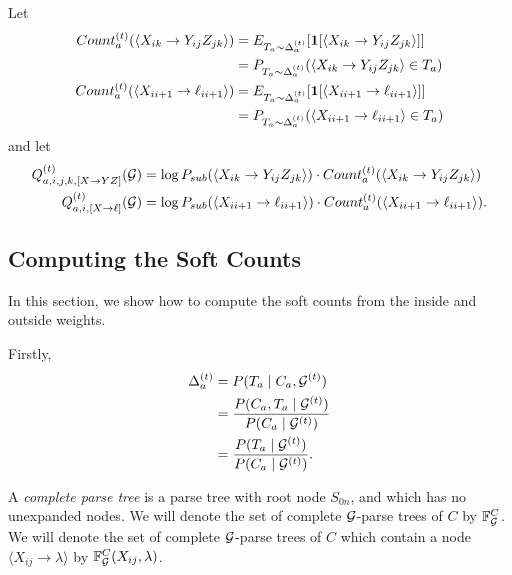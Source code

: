 
Let 
\begin{align*}
  Count_a^{(t)}(\langle X_{ik} \to Y_{ij} Z_{jk} \rangle) &=  E_{T_a \sim \Delta_a^{(t)}}[\mathbf{1} [ 
\langle X_{ik}
\to Y_{ij} Z_{jk} \rangle]]\\
&= P_{T_a \sim \Delta_a^{(t)}}( \langle X_{ik} \to Y_{ij} Z_{jk}
\rangle \in T_a)\\
Count_a^{(t)}(\langle X_{ii+1} \to \ell_{i i+1} \rangle) &=
E_{T_a \sim \Delta_a^{(t)}}[\mathbf{1} [ \langle X_{i i+1}
\to \ell_{i i+1} \rangle]] \\
&= P_{T_a \sim \Delta_a^{(t)}}( \langle X_{i i+1} \to \ell_{i i+1} \rangle \in T_a)\\
\end{align*}
and let
\begin{align*}
  Q^{(t)}_{a,i,j,k,[X\to YZ]}({\mathcal G}) &= 
\log P_{sub}(\langle X_{ik} \to Y_{ij}
Z_{jk}\rangle ) \cdot   Count_a^{(t)}(\langle X_{ik} \to Y_{ij} Z_{jk} \rangle)\\
Q^{(t)}_{a,i,[X\to \ell]}({\mathcal G}) &=
\log P_{sub}(\langle X_{i i+1} \to \ell_{i i+1}\rangle)
\cdot Count_a^{(t)}(\langle X_{ii+1} \to \ell_{i i+1} \rangle).
\end{align*}

\subsection{Computing the Soft Counts}
In this section, we show how to compute the soft counts from the inside and outside weights.

Firstly,
\begin{align*}
\Delta_a^{(t)} &= P(T_a \mid C_a, {\mathcal G}^{(t)})\\
 &= \frac{P(C_a, T_a \mid {\mathcal G}^{(t)})}{P(C_a \mid {\mathcal G}^{(t)})}\\
&= \frac{P(T_a \mid {\mathcal G}^{(t)})}{P(C_a \mid {\mathcal G}^{(t)})}.\\
\end{align*}

\begin{defn}
A {\em complete parse tree} is a parse tree with root node $S_{0n}$,
and which has no unexpanded nodes. We will denote the set of complete
${\mathcal G}$-parse trees of $C$ by $\mathbb{F}_{{\mathcal G}}^C$. We will denote the set of
complete ${\mathcal G}$-parse trees of $C$ which contain a node $\langle
X_{ij}\to \lambda \rangle$ by $\mathbb{F}_{{\mathcal G}}^C(X_{ij}, \lambda)$.
\end{defn}

